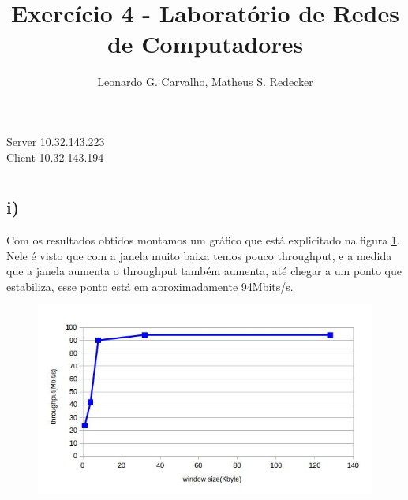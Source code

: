 \documentclass[12pt]{article}
\title{Exercício 4 - Laboratório de Redes de Computadores}
\author{Leonardo G. Carvalho\inst{1}, Matheus S. Redecker\inst{1}}
\begin{document}
 

\maketitle


\section{}
Server 10.32.143.223 \\
Client 10.32.143.194

\section{} 
\subsection{i)}
Com os resultados obtidos montamos um gráfico que está explicitado na figura \ref{1i}. Nele é visto que com a janela muito baixa temos pouco throughput, e a medida que a janela aumenta o throughput também aumenta, até chegar a um ponto que estabiliza, esse ponto está em aproximadamente 94Mbits/s.
\begin{figure}[ht]
\centering
\includegraphics[scale=0.5]{primeiro.jpg}
\caption{}
\label{1i}
\end{figure}

\newpage{}
\end{document}
